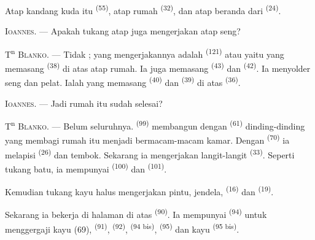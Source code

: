 
Atap kandang kuda itu  \textsuperscript{(55)},
atap rumah  \textsuperscript{(32)}, dan atap
beranda dari  \textsuperscript{(24)}.

\textsc{Ioannes}. --- Apakah tukang atap juga mengerjakan atap seng?

T\textsuperscript{n} \textsc{Blanko}. --- Tidak ; yang mengerjakannya
adalah  \textsuperscript{(121)} atau  yaitu yang memasang 
\textsuperscript{(38)} di atas atap rumah. Ia juga memasang
 \textsuperscript{(43)} dan 
\textsuperscript{(42)}. Ia menyolder seng dan pelat. Ialah yang
memasang  \textsuperscript{(40)} dan
 \textsuperscript{(39)} di atas
 \textsuperscript{(36)}.

\textsc{Ioannes}. --- Jadi rumah itu sudah selesai?

\VUsaut{3.0mm}
\VUsaut{3.0mm}

T\textsuperscript{n} \textsc{Blanko}. --- Belum seluruhnya.
 \textsuperscript{(99)} membangun dengan
 \textsuperscript{(61)} dinding-dinding yang membagi
rumah itu menjadi bermacam-macam kamar. Dengan 
\textsuperscript{(70)} ia melapisi 
\textsuperscript{(26)} dan tembok. Sekarang ia mengerjakan langit-langit
 \textsuperscript{(33)}. Seperti tukang batu, ia
mempunyai  \textsuperscript{(100)} dan  \textsuperscript{(101)}.

Kemudian tukang kayu halus mengerjakan pintu, jendela,  \textsuperscript{(16)} dan 
\textsuperscript{(19)}.

Sekarang ia bekerja di halaman di atas 
\textsuperscript{(90)}. Ia mempunyai 
\textsuperscript{(94)} untuk menggergaji kayu (69), 
\textsuperscript{(91)},  \textsuperscript{(92)},
 \textsuperscript{(94 bis)}, 
\textsuperscript{(95)} dan  kayu \textsuperscript{(95 bis)}.

